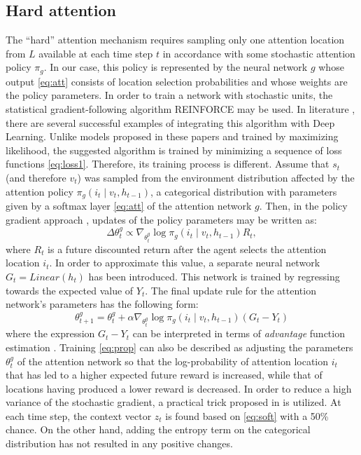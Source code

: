 \documentclass{article} \usepackage{nips15submit_e,times}
\begin{document}
\subsection{Hard attention}

The ``hard'' attention mechanism requires sampling only one attention location from $L$ available at each time step $t$ in accordance with some
stochastic attention policy $\pi_g$. 
In our case, this policy is represented by the neural network $g$ whose output \eqref{eq:att} consists of location selection probabilities and whose weights are the policy parameters. 
In order to train a network with stochastic units, the statistical gradient-following algorithm REINFORCE \cite{williams1992simple} may be used. In literature \cite{ba2015attention, xu2015show}, there are several successful examples 
of integrating this algorithm with Deep Learning. Unlike models proposed in these papers and trained by maximizing likelihood, the suggested algorithm is trained by minimizing a sequence of loss functions \eqref{eq:loss1}. Therefore, its training process 
is different. Assume that $s_t$ (and therefore $v_t$) was sampled from the environment distribution affected by 
the attention policy $\pi_g(i_t \mid v_t,h_{t-1})$, a categorical distribution with parameters given by a softmax 
layer \eqref{eq:att} of the attention network $g$. Then, in the policy gradient approach \cite{sutton2000policy}, updates 
of the policy parameters may be written as: 
\begin{equation}
	 \Delta \theta_t^g \propto \nabla_{\theta_t^g} \log \pi_g(i_t \mid v_t,h_{t-1}) R_t,
\end{equation}
where $R_t$ is a future discounted return after the agent selects the attention location $i_t$. In order to approximate this value, 
a separate neural network $G_t=Linear(h_t)$ has been introduced. This network is trained by regressing towards the expected value of $Y_t$. 
The final update rule for the attention network's parameters has the following form:
\begin{equation}
	\theta_{t+1}^g = \theta_t^g + \alpha \nabla_{\theta_t^g} \log \pi_g(i_t \mid v_t,h_{t-1}) (G_t - Y_t)
        \label{eq:prop}
\end{equation}
where the expression $G_t - Y_t$ can be interpreted in terms of \emph{advantage} function estimation \cite{schulman2015high}. Training \eqref{eq:prop} can also be described \cite{mnih2014ram} as adjusting the parameters $\theta_t^g$ of the attention network so that the log-probability of attention location $i_t$ that has led to a higher expected future reward is increased, while that of locations having produced a lower reward is decreased. In order to reduce a high variance of the stochastic gradient, a practical trick proposed in \cite{xu2015show} is utilized. At each time step, the context vector $z_t$ is found based on \eqref{eq:soft} with a 50\% chance. On the other hand, adding the entropy term on the categorical distribution has not resulted in any positive changes.
\end{document}
